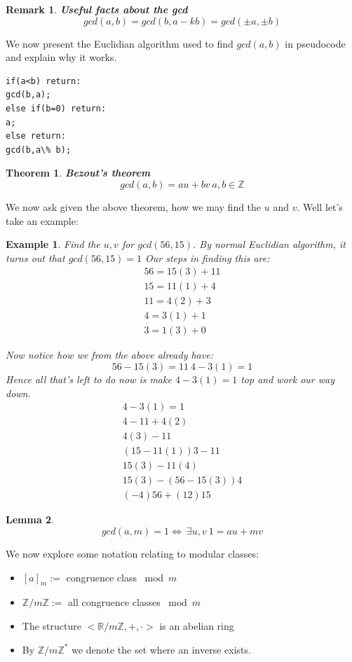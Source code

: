 \documentclass[titlepage]{article}
\newtheorem{remark}{Remark}[section]
\newtheorem{theorem}{Theorem}[section]
\newtheorem{lemma}[theorem]{Lemma}
\newtheorem{example}{Example}[section]
\begin{document}
\begin{remark}\textbf{Useful facts about the gcd}
$$gcd(a,b) = gcd(b,a-kb)=gcd(\pm a, \pm b)$$
\end{remark}

We now present the Euclidian algorithm used to find $gcd(a,b)$ in pseudocode and explain why it works.


\begin{lstlisting}
if(a<b) return:
gcd(b,a);
else if(b=0) return:
a;
else return:
gcd(b,a\% b);
\end{lstlisting}

\begin{theorem}\textbf{Bezout's theorem}
$$gcd(a,b) = au + bv \ a,b \in \mathbb{Z}$$
\end{theorem}

We now ask given the above theorem, how we may find the $u$ and $v$. Well let's take an example:
\begin{example}
Find the $u,v$ for $gcd(56,15)$.
By normal Euclidian algorithm, it turns out that $gcd(56,15) = 1$ Our steps in finding this are:
\begin{align*}
    56 = 15(3) + 11\\
    15 = 11(1) + 4\\
    11 = 4(2) + 3\\
    4 = 3(1) + 1\\
    3 = 1(3) + 0
\end{align*}

Now notice how we from the above already have:
$$56 - 15(3) = 11 \ 4 - 3(1)=1$$
Hence all that's left to do now is make $4 - 3(1)=1$ top and work our way down.
\begin{align*}
    4 - 3(1) = 1\\
    4 -  11 + 4(2)\\
    4(3) - 11\\
    (15 - 11(1))3 - 11\\
    15(3) - 11(4)\\
    15(3) - (56-15(3))4\\
    (-4)56 + (12)15 
\end{align*}

\end{example}

\begin{lemma}
$$gcd(a,m) = 1 \iff \ \exists u,v \ 1 = au + mv$$
\end{lemma}




We now explore some notation relating to modular classes:
\begin{itemize}
    \item $[a]_{m} :=$ congruence class $\bmod{m}$
    \item $\mathbb{Z} / m\mathbb{Z} :=$ all congruence classes $\bmod{m}$
    \item The structure $<\mathbb{R} / m\mathbb{Z}, + , \cdot>$ is an abelian ring 
    \item By $\mathbb{Z} / m\mathbb{Z}^{*}$ we denote the set where an inverse exists. 
\end{itemize}
\end{document}
